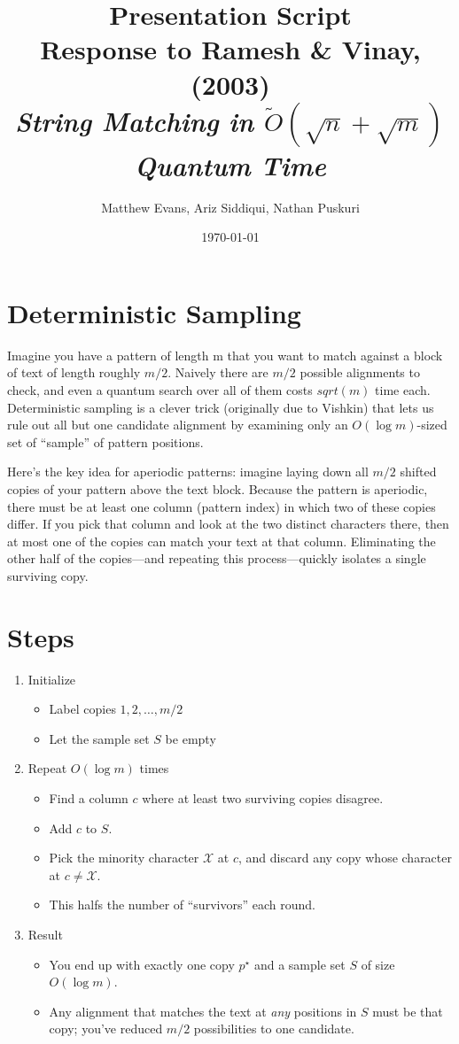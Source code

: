\documentclass[11pt]{article}
\title{Presentation Script \\ 
\Large{Response to Ramesh \& Vinay, (2003)\\ 
\small{\textit{String Matching in \(\tilde{O}(\sqrt{n} + \sqrt{m})\) Quantum Time}} }}
\author{%
\normalsize{Matthew Evans, Ariz Siddiqui, Nathan Puskuri}
}
\date{\today}
\begin{document}
\maketitle

\section*{Deterministic Sampling}
Imagine you have a pattern of length m that you want to match against a block of text of length roughly \(m/2\). Naively there are \(m/2\) possible alignments to check, and even a quantum search over all of them costs \(sqrt(m)\) time each. Deterministic sampling is a clever trick (originally due to Vishkin) that lets us rule out all but one candidate alignment by examining only an \(O(\log m)\)-sized set of ``sample'' of pattern positions.

Here's the key idea for aperiodic patterns: imagine laying down all \(m/2\) shifted copies of your pattern above the text block. Because the pattern is aperiodic, there must be at least one column (pattern index) in which two of these copies differ. If you pick that column and look at the two distinct characters there, then at most one of the copies can match your text at that column. Eliminating the other half of the copies—and repeating this process—quickly isolates a single surviving copy.

\section*{Steps}
\begin{enumerate}
    \item Initialize \begin{itemize}
              \item Label copies \(1, 2, \dots, m/2\)
              \item Let the sample set \(S\) be empty
          \end{itemize}
    \item Repeat \(O(\log m)\) times \begin{itemize}
              \item Find a column \(c\) where at least two surviving copies disagree.
              \item Add \(c\) to \(S\).
              \item Pick the minority character \(\mathcal{X}\) at \(c\), and discard any copy whose character at \(c \neq \mathcal{X}\).
              \item This halfs the number of ``survivors'' each round.
          \end{itemize}
    \item Result \begin{itemize}
              \item You end up with exactly one copy \(p^\star\) and a sample set \(S\) of size \(O(\log m)\).
              \item Any alignment that matches the text at \textit{any} positions in \(S\) must be that copy; you've reduced \(m/2\) possibilities to one candidate.
          \end{itemize}
\end{enumerate}
\end{document}
